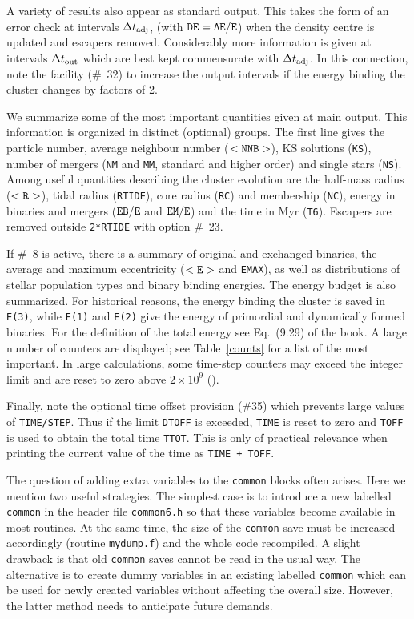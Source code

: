\documentclass[12pt]{article}
\begin{document}
A variety of results also appear as standard output.
This takes the form of an error check at intervals ${\Delta t}_{\rm adj}$,
(with ${\tt DE = \Delta E/E}$) when the density centre is updated and
escapers removed.
Considerably more information is given at intervals ${\Delta t}_{\rm out}$
which are best kept commensurate with ${\Delta t}_{\rm adj}$.
In this connection, note the facility (\#~32) to increase the output
intervals if the energy binding the cluster changes by factors of 2.

We summarize some of the most important quantities given at main output.
This information is organized in distinct (optional) groups.
The first line gives the particle number, average neighbour number
($<{\tt NNB}>$), KS solutions ({\tt KS}), number of mergers ({\tt NM} and
{\tt MM}, standard and higher order) and single stars ({\tt NS}).
Among useful quantities describing the cluster evolution are the half-mass
radius ($<{\tt R>}$), tidal radius ({\tt RTIDE}), core radius ({\tt RC}) and
membership ({\tt NC}), energy in binaries and mergers
(${\tt EB/E}$ and ${\tt EM/E}$) and the time in Myr ({\tt T6}).
Escapers are removed outside {\tt 2*RTIDE} with option \#~23.

If \#~8 is active, there is a summary of original and exchanged binaries, the
average and maximum eccentricity ($<{\tt E>}$ and {\tt EMAX}), as well as
distributions of stellar population types and binary binding energies.
The energy budget is also summarized.
For historical reasons, the energy binding the cluster is saved in
{\tt E(3)}, while {\tt E(1)} and {\tt E(2)} give the energy of primordial
and dynamically formed binaries.
For the definition of the total energy see Eq.~(9.29) of the book.
A large number of counters are displayed; see Table~\ref{counts} for a list
of the most important.
In large calculations, some time-step counters may exceed the integer limit
and are reset to zero above $2 \times 10^9$ ().

Finally, note the optional time offset provision (\#35) which prevents large
values of {\tt TIME/STEP}.
Thus if the limit {\tt DTOFF} is exceeded, {\tt TIME} is reset to zero and
{\tt TOFF} is used to obtain the total time {\tt TTOT}.
This is only of practical relevance when printing the current value of the
time as {\tt TIME + TOFF}.

The question of adding extra variables to the {\tt common} blocks often
arises.
Here we mention two useful strategies.
The simplest case is to introduce a new labelled {\tt common} in the header
file {\tt common6.h} so that these variables become available in most
routines.
At the same time, the size of the {\tt common} save must be increased
accordingly (\cf routine {\tt mydump.f}) and the whole code recompiled.
A slight drawback is that old {\tt common} saves cannot be read in the
usual way.
The alternative is to create dummy variables in an existing labelled
{\tt common} which can be used for newly created variables without affecting
the overall size.
However, the latter method needs to anticipate future demands.
\end{document}
